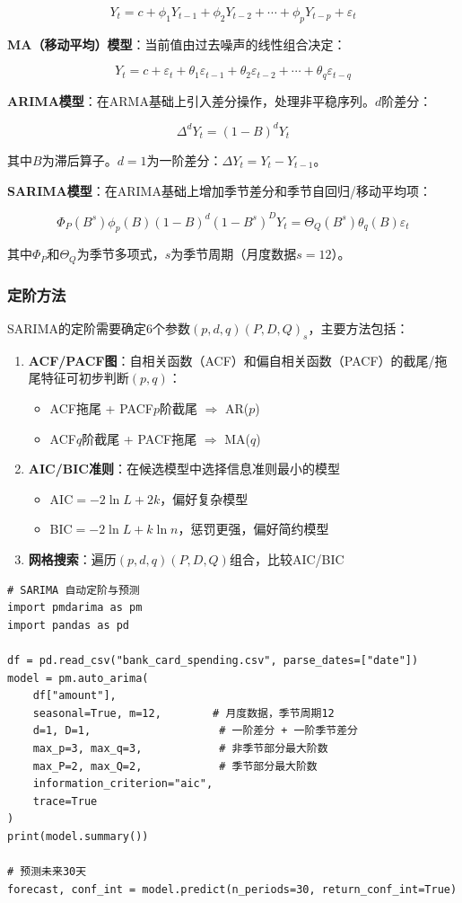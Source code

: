 \[
Y_t = c + \phi_1 Y_{t-1} + \phi_2 Y_{t-2} + \cdots + \phi_p Y_{t-p} + \varepsilon_t
\]

\textbf{MA（移动平均）模型}：当前值由过去噪声的线性组合决定：

\[
Y_t = c + \varepsilon_t + \theta_1 \varepsilon_{t-1} + \theta_2 \varepsilon_{t-2} + \cdots + \theta_q \varepsilon_{t-q}
\]

\textbf{ARIMA模型}：在ARMA基础上引入差分操作，处理非平稳序列。$d$阶差分：

\[
\Delta^d Y_t = (1-B)^d Y_t
\]

其中$B$为滞后算子。$d=1$为一阶差分：$\Delta Y_t = Y_t - Y_{t-1}$。

\textbf{SARIMA模型}：在ARIMA基础上增加季节差分和季节自回归/移动平均项：

\[
\Phi_P(B^s)\phi_p(B)(1-B)^d(1-B^s)^D Y_t = \Theta_Q(B^s)\theta_q(B)\varepsilon_t
\]

其中$\Phi_P$和$\Theta_Q$为季节多项式，$s$为季节周期（月度数据$s=12$）。

\subsubsection{定阶方法}

SARIMA的定阶需要确定6个参数$(p,d,q)(P,D,Q)_s$，主要方法包括：

\begin{enumerate}[leftmargin=2em]
  \item \textbf{ACF/PACF图}：自相关函数（ACF）和偏自相关函数（PACF）的截尾/拖尾特征可初步判断$(p,q)$：
    \begin{itemize}
      \item ACF拖尾 + PACF$p$阶截尾 $\Rightarrow$ AR($p$)
      \item ACF$q$阶截尾 + PACF拖尾 $\Rightarrow$ MA($q$)
    \end{itemize}
  \item \textbf{AIC/BIC准则}：在候选模型中选择信息准则最小的模型
    \begin{itemize}
      \item AIC$= -2\ln L + 2k$，偏好复杂模型
      \item BIC$= -2\ln L + k\ln n$，惩罚更强，偏好简约模型
    \end{itemize}
  \item \textbf{网格搜索}：遍历$(p,d,q)(P,D,Q)$组合，比较AIC/BIC
\end{enumerate}

\begin{lstlisting}[style=python]
# SARIMA 自动定阶与预测
import pmdarima as pm
import pandas as pd

df = pd.read_csv("bank_card_spending.csv", parse_dates=["date"])
model = pm.auto_arima(
    df["amount"],
    seasonal=True, m=12,        # 月度数据，季节周期12
    d=1, D=1,                    # 一阶差分 + 一阶季节差分
    max_p=3, max_q=3,            # 非季节部分最大阶数
    max_P=2, max_Q=2,            # 季节部分最大阶数
    information_criterion="aic",
    trace=True
)
print(model.summary())

# 预测未来30天
forecast, conf_int = model.predict(n_periods=30, return_conf_int=True)
\end{lstlisting}

